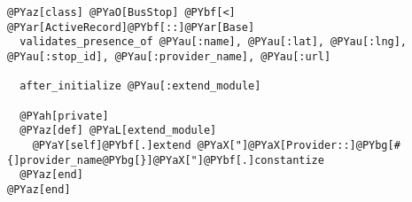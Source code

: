 \begin{Verbatim}[commandchars=@\[\]]
@PYaz[class] @PYaO[BusStop] @PYbf[<] @PYar[ActiveRecord]@PYbf[::]@PYar[Base]
  validates_presence_of @PYau[:name], @PYau[:lat], @PYau[:lng], @PYau[:stop_id], @PYau[:provider_name], @PYau[:url]
  
  after_initialize @PYau[:extend_module]
  
  @PYah[private]
  @PYaz[def] @PYaL[extend_module]
    @PYaY[self]@PYbf[.]extend @PYaX["]@PYaX[Provider::]@PYbg[#{]provider_name@PYbg[}]@PYaX["]@PYbf[.]constantize
  @PYaz[end]
@PYaz[end]
\end{Verbatim}
